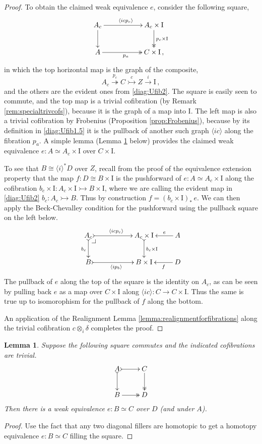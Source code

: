 \documentclass[11pt,reqno]{amsart}
\makeatletter
\newcommand{\mono}{\ensuremath{\rightarrowtail}}
\newcommand{\ra}{\ensuremath{\rightarrow}}
\newcommand{\cof}{\ensuremath{\rightarrowtail}}
\newcommand{\fib}{\ensuremath{\twoheadrightarrow}}
\renewcommand{\to}{\ensuremath{\rightarrow}}
\newcommand{\gph}[1]{\ensuremath{\langle #1 \rangle}}
\newcommand{\I}{\ensuremath{\mathrm{I}}}
\newtheorem{lemma}[theorem]{Lemma}
\theoremstyle{remark}
\theoremstyle{definition}
\newcommand{\pbcorner}[1][dr]{\save*!/#1-1.2pc/#1:(-1,1)@^{|-}\restore}
\makeatother
\begin{document}
\begin{proof}
To obtain the claimed weak equivalence $e$, consider the following square, 
\begin{equation}\label{diag:Ufibn}
\xymatrix{
A_c \ar[d] \ar[rr]^{\langle icp_c \rangle} && A_c\times\I \ar@{>>}[d]^{p_c\times \I} \\
A  \ar@{>>}[rr]_{p_a} &&  C\times\I \,,
}
\end{equation}
in which the top horizontal map is the graph of the composite,
\[
A_c \stackrel{p_c}{\fib} C \stackrel{c}{\mono} Z \stackrel{i}{\to} \I\,,
\]
and the others are the evident ones from \eqref{diag:Ufib2}.
The square is easily seen to commute, and the top map is a trivial cofibration (by Remark \ref{rem:specialtrivcofs}), because it is the graph of a map into $\I$.  The left map is also a trivial cofibration by Frobenius (Proposition \ref{prop:Frobenius}), because by its definition in \eqref{diag:Ufib1.5} it is the pullback of another such graph $\gph{ic}$ along the fibration $p_a$.  A simple lemma (Lemma \ref{lem:simple} below) provides the claimed weak equivalence $e:A \simeq A_c\times \I$ over $C\times \I$.  

To see that $B\cong \gph{i}^*D$ over $Z$, recall from the proof of the equivalence extension property that the map $f:D\cong B\times \I$ is the pushforward of  $e:A \simeq A_c\times \I$ along the cofibration $b_c\times\I :A_c\times\I \cof B\times\I$, where we are calling the evident map in \eqref{diag:Ufib2} $b_c : A_c\cof B$.  Thus by construction $f = (b_c\times\I)_*\,e$.  We can then apply the Beck-Chevalley condition for the pushforward using the pullback square on the left below.
\begin{equation}
\xymatrix{
A_c \ar@{>->}[d]_{b_c} \ar@{>->}[rr]^{\gph{icp_c}} \pbcorner && A_c\times\I \ar@{>->}[d]^{b_c\times \I} & \ar[l]_-e A\\
B  \ar@{>->}[rr]_{\gph{ip_b}}  &&  B\times\I  & \ar[l]^-f D
}
\end{equation}
The pullback of $e$ along the top of the square is the identity on $A_c$, as can be seen by pulling back $e$ as a map over $C\times \I$ along $\gph{ic} :  C\ra C\times\I$. Thus the same is true up to isomorophism for the pullback of $f$ along the bottom.

An application of the Realignment Lemma \ref{lemma:realignmentforfibrations} along the trivial cofibration $c\otimes_i\delta$ completes the proof.
\end{proof}

\begin{lemma}\label{lem:simple}
Suppose the following square commutes and the indicated cofibrations are trivial.
\begin{equation}\label{diag:standard1}
\xymatrix{
A \ar@{>->}[d] \ar@{>->}[r] & C \ar@{>>}[d] \\
B  \ar@{>>}[r] &  D \\
}
\end{equation}
Then there is a weak equivalence $e : B \simeq C$ over $D$ (and under $A$).
\end{lemma}
\begin{proof}
Use the fact that any two diagonal fillers are homotopic to get a homotopy equivalence $e : B \simeq C$ filling the square.
\end{proof}
\end{document}

